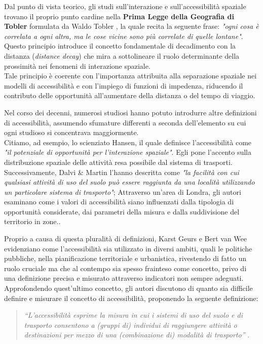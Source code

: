 \noindent
Dal punto di vista teorico, gli studi sull'interazione e sull'accessibilità spaziale trovano il proprio punto cardine nella \textbf{Prima Legge della Geografia di Tobler} formulata da Waldo Tobler \cite{tobler1970}, la quale recita la seguente frase: \textit{"ogni cosa è correlata a ogni altra, ma le cose vicine sono più correlate di quelle lontane"}. Questo principio introduce il concetto fondamentale di decadimento con la distanza (\textit{distance decay}) che mira a sottolineare il ruolo determinante della prossimità nei fenomeni di interazione spaziale\cite{mazzulla2024}.\\
Tale principio è coerente con l'importanza attribuita alla separazione spaziale nei modelli di accessibilità e con l'impiego di funzioni di impedenza, riducendo il contributo delle opportunità all'aumentare della distanza o del tempo di viaggio.

Nel corso dei decenni, numerosi studiosi hanno potuto introdurre altre definizioni di accessibilità, assumendo sfumature differenti a seconda dell'elemento su cui ogni studioso si concentrava maggiormente.\\
Citiamo, ad esempio, lo scienziato Hansen, il quale definisce l'accessibilità come \textit{"il potenziale di opportunità per l'interazione spaziale"}. Egli pone l'accento sulla distribuzione spaziale delle attività resa possibile dal sistema di trasporti.\cite{hansen1959}
Successivamente, Dalvi \& Martin l'hanno descritta come \textit{"la facilità con cui qualsiasi attività di uso del suolo può essere raggiunta da una località utilizzando un particolare sistema di trasporto"}; Attraverso un'area di Londra, gli autori esaminano come i valori di accessibilità siano influenzati dalla tipologia di opportunità considerate, dai parametri della misura e dalla suddivisione del territorio in zone.\cite{dalvi1976}.

Proprio a causa di questa pluralità di definizioni, Karst Geurs e Bert van Wee \cite{geurs2004} evidenziano come l'accessibilità sia utilizzato in diversi ambiti, quali le politiche pubbliche, nella pianificazione territoriale e urbanistica, rivestendo di fatto un ruolo cruciale ma che al contempo sia spesso frainteso come concetto, privo di una definizione precisa e misurato attraverso indicatori non sempre adeguati.
Approfondendo quest'ultimo concetto, gli autori discutono di quanto sia difficile definire e misurare il concetto di accessibilità, proponendo la seguente definizione:
\begin{quote}
\textit{``L'accessibilità esprime la misura in cui i sistemi di uso del suolo e di trasporto consentono a (gruppi di) individui di raggiungere attività o destinazioni per mezzo di una (combinazione di) modalità di trasporto''} \cite{geurs2004}.
\end{quote}

